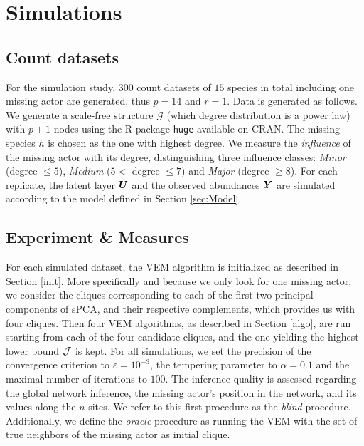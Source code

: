 \section{Simulations} \label{sec:Simul}
\subsection{Count datasets}
For the simulation study, 300 count datasets of $15$ species in total including one missing actor are generated, thus $p=14$ and $r=1$. 
Data is generated as follows.
We generate a scale-free structure $\mathcal{G}$ (which degree distribution is a power law) with $p+1$ nodes using the R package \texttt{huge} \citep{huge} available on CRAN. 
The missing species $h$ is chosen as the one with highest degree. We measure the {\sl influence} of the missing actor with its degree, distinguishing three influence classes: \textit{Minor} (degree $\leq 5$), \textit{Medium} ($5<$ degree $\leq 7$) and \textit{Major} (degree $\geq 8$). For each replicate, the latent layer ${\boldsymbol{U}}$ and the observed abundances ${\boldsymbol{Y}}$ are simulated according to the model defined in Section \ref{sec:Model}.


\subsection{Experiment \& Measures}
For each simulated dataset, the VEM algorithm is initialized as described in Section \ref{init}. 
More specifically and because we only look for one missing actor, we consider the cliques corresponding to each of the first two principal components of sPCA, and their respective complements, which provides us with four cliques.
Then four VEM algorithms, as described in Section \ref{algo}, are run starting from each of the four candidate cliques, and the one yielding the highest lower bound ${\mathcal{J}}$ is kept. 
For all simulations, we set the precision of the convergence criterion to $\varepsilon=10^{-3}$, the tempering parameter to $\alpha=0.1$ and the maximal number of iterations to $100$. 
The  inference quality is assessed regarding the global network inference, the missing actor's position in the network, and its values along the $n$ sites. We refer to this first procedure as the \textit{blind} procedure. Additionally, we define the \textit{oracle} procedure as running the VEM with the set of true neighbors of the missing actor as initial clique.\\

